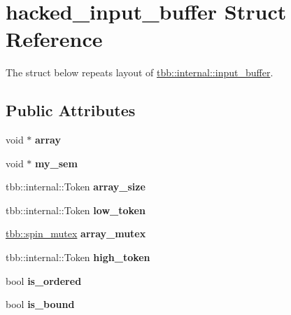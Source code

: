 \hypertarget{structhacked__input__buffer}{}\section{hacked\+\_\+input\+\_\+buffer Struct Reference}
\label{structhacked__input__buffer}


The struct below repeats layout of \hyperlink{classtbb_1_1internal_1_1input__buffer}{tbb\+::internal\+::input\+\_\+buffer}.  


\subsection*{Public Attributes}
\begin{DoxyCompactItemize}
\item 
\hypertarget{structhacked__input__buffer_a1489988f7462cf42bf8c1aa1a5b39e4e}{}void $\ast$ {\bfseries array}\label{structhacked__input__buffer_a1489988f7462cf42bf8c1aa1a5b39e4e}

\item 
\hypertarget{structhacked__input__buffer_a336e91ae0dd1e54c05183888cb777283}{}void $\ast$ {\bfseries my\+\_\+sem}\label{structhacked__input__buffer_a336e91ae0dd1e54c05183888cb777283}

\item 
\hypertarget{structhacked__input__buffer_a2f8c3d5301f5ec4f82654d9d73d2b745}{}tbb\+::internal\+::\+Token {\bfseries array\+\_\+size}\label{structhacked__input__buffer_a2f8c3d5301f5ec4f82654d9d73d2b745}

\item 
\hypertarget{structhacked__input__buffer_a746499bcb0f47640d13f69757aa47251}{}tbb\+::internal\+::\+Token {\bfseries low\+\_\+token}\label{structhacked__input__buffer_a746499bcb0f47640d13f69757aa47251}

\item 
\hypertarget{structhacked__input__buffer_a35ebcf7a1d778573dbc97626ea3dc099}{}\hyperlink{classtbb_1_1spin__mutex}{tbb\+::spin\+\_\+mutex} {\bfseries array\+\_\+mutex}\label{structhacked__input__buffer_a35ebcf7a1d778573dbc97626ea3dc099}

\item 
\hypertarget{structhacked__input__buffer_a0428700549cfd61521912bf34862611a}{}tbb\+::internal\+::\+Token {\bfseries high\+\_\+token}\label{structhacked__input__buffer_a0428700549cfd61521912bf34862611a}

\item 
\hypertarget{structhacked__input__buffer_a799976069c9c3788307faa2fcbd5bbc2}{}bool {\bfseries is\+\_\+ordered}\label{structhacked__input__buffer_a799976069c9c3788307faa2fcbd5bbc2}

\item 
\hypertarget{structhacked__input__buffer_a7cc782ac860523597979740be9ca7250}{}bool {\bfseries is\+\_\+bound}\label{structhacked__input__buffer_a7cc782ac860523597979740be9ca7250}

\end{DoxyCompactItemize}


